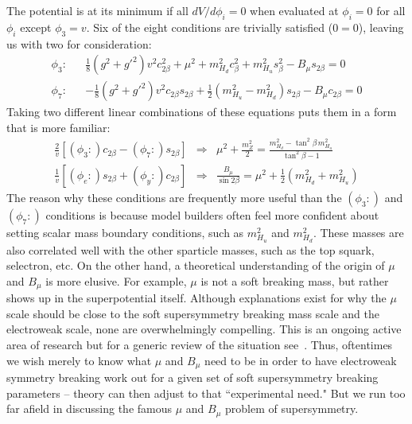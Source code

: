 \documentclass[12pt]{article}
\def\eeq{\end{eqnarray}}
\def\bea{\begin{eqnarray}}
\def\eea{\end{eqnarray}}
\begin{document}
The potential is at its minimum if all $dV/d\phi_i=0$ when evaluated at $\phi_i=0$ for all $\phi_i$ except $\phi_3=v$.  Six of the eight conditions are trivially satisfied ($0=0$), leaving us with two for consideration:
\bea
\phi_3: & & \frac{1}{8}(g^2+g'^2)v^2c^2_{2\beta}+\mu^2+m_{H_d}^2c^2_\beta+m^2_{H_u}s^2_\beta-B_\mu s_{2\beta}=0 \\
\phi_7: && -\frac{1}{8}(g^2+g'^2)v^2c_{2\beta}s_{2\beta} +\frac{1}{2}(m_{H_u}^2-m_{H_d}^2)s_{2\beta} -B_\mu c_{2\beta} =0
\eea
Taking two different linear combinations of these equations puts them in a form that is more familiar:
\bea
\frac{2}{v}\left[ (\phi_3:)c_{2\beta}-(\phi_7:)s_{2\beta}\right] &\Longrightarrow &
\mu^2+\frac{m_Z^2}{2}=\frac{m^2_{H_d}-\tan^2\beta\, m^2_{H_u}}{\tan^2\beta -1} \label{eq:ewsb1} \\
\frac{1}{v}\left[(\phi_e:)s_{2\beta}+(\phi_y:)c_{2\beta}\right] &\Longrightarrow &
\frac{B_\mu}{\sin 2\beta}=\mu^2+\frac{1}{2}(m^2_{H_d}+m^2_{H_u}) \label{eq:ewsb2}
\eeq
The reason why these conditions are frequently more useful than the $(\phi_3:)$ and $(\phi_7:)$ conditions is because model builders often feel more confident about setting scalar mass boundary conditions, such as $m_{H_u}^2$ and $m^2_{H_d}$. These masses are also correlated well with the other sparticle masses, such as the top squark, selectron, etc. On the other hand, a theoretical understanding of the origin of $\mu$ and $B_\mu$ is more elusive. For example, $\mu$ is not a soft breaking mass, but rather shows up in the superpotential itself. Although explanations exist for why the $\mu$ scale should be close to the soft supersymmetry breaking mass scale and the electroweak scale, none are overwhelmingly compelling. This is an ongoing active area of research but for a generic review of the situation see~\cite{Polonsky:1999qd}. Thus,
oftentimes we wish merely to know what $\mu$ and $B_\mu$ need to be in order to have electroweak symmetry breaking work out for a given set of soft supersymmetry breaking parameters -- theory can then adjust to that ``experimental need." But we run too far afield in discussing the famous $\mu$ and $B_\mu$ problem of supersymmetry.
\end{document}
